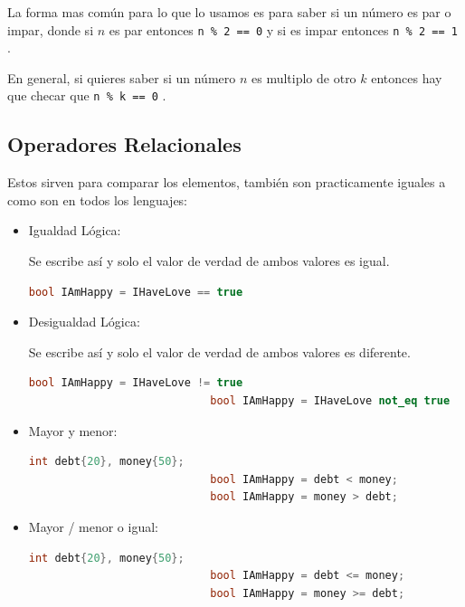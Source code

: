 \documentclass[12pt, fleqn]{report}                             %
\theoremstyle{break}                                            %
\newcommand{\textCode}[1]  { \texttt{#1} }                      %
\begin{document}
                    La forma mas común para lo que lo usamos
                    es para saber si un número es par o impar, donde
                    si $n$ es par entonces \textCode{n \% 2 == 0} y si es impar
                    entonces \textCode{n \% 2 == 1}.

                    En general, si quieres saber si un número $n$ es multiplo de 
                    otro $k$ entonces hay que checar que \textCode{n \% k == 0}.

            \clearpage
            \subsection{Operadores Relacionales}

                Estos sirven para comparar los elementos, también son practicamente iguales a como son en todos los
                lenguajes:
                \begin{itemize}
                    \item Igualdad Lógica: 
                    
                        Se escribe así y solo el valor de verdad de ambos valores es igual.
                        \begin{lstlisting}[language=C++, gobble=28]
                            bool IAmHappy = IHaveLove == true
                        \end{lstlisting}
                    
                    \item Desigualdad Lógica: 
                    
                        Se escribe así y solo el valor de verdad de ambos valores es diferente.
                        \begin{lstlisting}[language=C++, gobble=28]
                            bool IAmHappy = IHaveLove != true
                            bool IAmHappy = IHaveLove not_eq true
                        \end{lstlisting}

                    \item Mayor y menor: 
                        \begin{lstlisting}[language=C++, gobble=28]
                            int debt{20}, money{50};
                            bool IAmHappy = debt < money;
                            bool IAmHappy = money > debt;
                        \end{lstlisting}

                    \item Mayor / menor o igual: 
                        \begin{lstlisting}[language=C++, gobble=28]
                            int debt{20}, money{50};
                            bool IAmHappy = debt <= money;
                            bool IAmHappy = money >= debt;
                        \end{lstlisting}
                \end{itemize}
\end{document}
